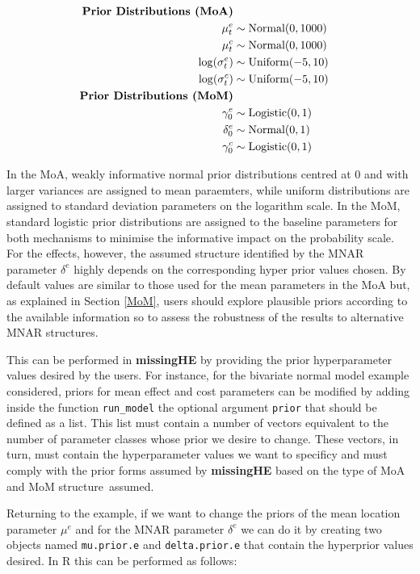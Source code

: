 \documentclass[]{article}
\begin{document}
\begin{align*}
\hspace*{-5cm}
\mbox{\textbf{Prior Distributions (MoA)}}\\
\mu^{e}_{t}&\sim \mbox{Normal}(0,1000)\\
\mu^{c}_{t}&\sim \mbox{Normal}(0,1000)\\
\log(\sigma^{e}_{t})&\sim \mbox{Uniform}(-5,10)\\
\log(\sigma^{c}_{t})&\sim \mbox{Uniform}(-5,10)\\
\mbox{\textbf{Prior Distributions (MoM)}}\\
\gamma^{e}_{0}&\sim \mbox{Logistic}(0,1)\\
\delta^{e}_{0}&\sim \mbox{Normal}(0,1)\\
\gamma^{c}_{0}&\sim \mbox{Logistic}(0,1)
\end{align*}

In the MoA, weakly informative normal prior distributions centred at
\(0\) and with larger variances are assigned to mean paraemters, while
uniform distributions are assigned to standard deviation parameters on
the logarithm scale. In the MoM, standard logistic prior distributions
are assigned to the baseline parameters for both mechanisms to minimise
the informative impact on the probability scale. For the effects,
however, the assumed structure identified by the MNAR parameter
\(\delta^{e}\) highly depends on the corresponding hyper prior values
chosen. By default values are similar to those used for the mean
parameters in the MoA but, as explained in Section \ref{MoM}, users
should explore plausible priors according to the available information
so to assess the robustness of the results to alternative MNAR
structures.

This can be performed in \textbf{missingHE} by providing the prior
hyperparameter values desired by the users. For instance, for the
bivariate normal model example considered, priors for mean effect and
cost parameters can be modified by adding inside the function
\texttt{run\_model} the optional argument \texttt{prior} that should be
defined as a list. This list must contain a number of vectors equivalent
to the number of parameter classes whose prior we desire to change.
These vectors, in turn, must contain the hyperparameter values we want
to specificy and must comply with the prior forms assumed by
\textbf{missingHE} based on the type of MoA and MoM structure~assumed.

Returning to the example, if we want to change the priors of the mean
location parameter \(\mu^{e}\) and for the MNAR parameter \(\delta^{e}\)
we can do it by creating two objects named \texttt{mu.prior.e} and
\texttt{delta.prior.e} that contain the hyperprior values desired. In R
this can be performed as follows:
\end{document}
